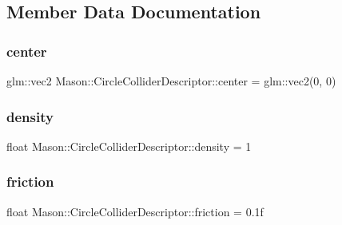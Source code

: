 \subsection{Member Data Documentation}
\hypertarget{class_mason_1_1_circle_collider_descriptor_a95cb9b34dd352a4fb9d13b883bebc4b6}{}\label{class_mason_1_1_circle_collider_descriptor_a95cb9b34dd352a4fb9d13b883bebc4b6} 
\subsubsection{\texorpdfstring{center}{center}}
{\footnotesize\ttfamily glm\+::vec2 Mason\+::\+Circle\+Collider\+Descriptor\+::center = glm\+::vec2(0, 0)}

\hypertarget{class_mason_1_1_circle_collider_descriptor_a3cc660a99bd52e811faff6dfc491ff56}{}\label{class_mason_1_1_circle_collider_descriptor_a3cc660a99bd52e811faff6dfc491ff56} 
\subsubsection{\texorpdfstring{density}{density}}
{\footnotesize\ttfamily float Mason\+::\+Circle\+Collider\+Descriptor\+::density = 1}

\hypertarget{class_mason_1_1_circle_collider_descriptor_a77cbaa2de9aa4787e94616b4a0cf5cf0}{}\label{class_mason_1_1_circle_collider_descriptor_a77cbaa2de9aa4787e94616b4a0cf5cf0} 
\subsubsection{\texorpdfstring{friction}{friction}}
{\footnotesize\ttfamily float Mason\+::\+Circle\+Collider\+Descriptor\+::friction = 0.\+1f}

\hypertarget{class_mason_1_1_circle_collider_descriptor_a8785a58429df1c9bac9f1f482164e9f1}{}\label{class_mason_1_1_circle_collider_descriptor_a8785a58429df1c9bac9f1f482164e9f1} 
